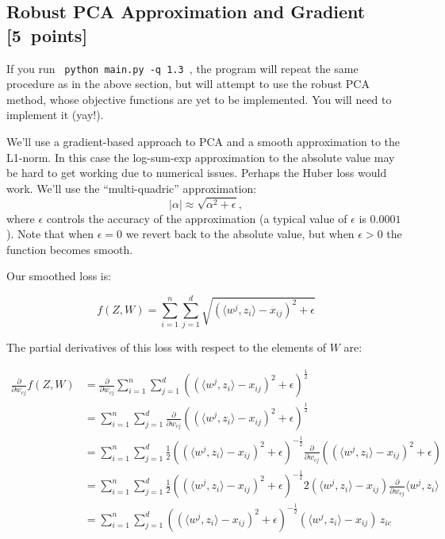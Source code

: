 \documentclass{article}
\newcommand\pts[1]{\textcolor{pointscolour}{[#1~points]}}
\begin{document}
\subsection{Robust PCA Approximation and Gradient \pts{5}}

If you run \verb| python main.py -q 1.3 |, the program will repeat the same procedure as in the above section, but will attempt to use the robust PCA method, whose objective functions are yet to be implemented. You will need to implement it (yay!).

We'll use a gradient-based approach to PCA and a smooth approximation to the L1-norm. In this case the log-sum-exp approximation to the absolute value may be hard to get working due to numerical issues. Perhaps the Huber loss would work. We'll use the ``multi-quadric'' approximation:
\[
|\alpha| \approx \sqrt{\alpha^2 + \epsilon},
\]
where $\epsilon$ controls the accuracy of the approximation (a typical value of $\epsilon$ is $0.0001$). Note that when $\epsilon=0$ we revert back to the absolute value, but when $\epsilon>0$ the function becomes smooth.

Our smoothed loss is:

\[
f(Z,W) = \sum_{i=1}^n\sum_{j=1}^d \sqrt{(\langle w^j, z_i\rangle - x_{ij})^2 + \epsilon }
\]

The partial derivatives of this loss with respect to the elements of $W$ are:

\begin{align*}
\frac{\partial}{\partial w_{cj}} f(Z,W) &= \frac{\partial}{\partial w_{cj}} \sum_{i=1}^n\sum_{j=1}^d \left( (\langle w^j, z_i\rangle - x_{ij})^2 + \epsilon \right)^{\frac12} \\
 &= \sum_{i=1}^n\sum_{j=1}^d  \frac{\partial}{\partial w_{cj}} \left( (\langle w^j, z_i\rangle - x_{ij})^2 + \epsilon \right)^{\frac12} \\
  &= \sum_{i=1}^n\sum_{j=1}^d  \frac12 \left( (\langle w^j, z_i\rangle - x_{ij})^2 + \epsilon \right)^{-\frac12} \frac{\partial}{\partial w_{cj}} \left( (\langle w^j, z_i\rangle - x_{ij})^2 + \epsilon \right) \\
  &= \sum_{i=1}^n\sum_{j=1}^d  \frac12  \left( (\langle w^j, z_i\rangle - x_{ij})^2 + \epsilon \right)^{-\frac12} 2  (\langle w^j, z_i\rangle - x_{ij})  \frac{\partial}{\partial w_{cj}} \langle w^j, z_i\rangle \\
  &= \sum_{i=1}^n\sum_{j=1}^d  \left( (\langle w^j, z_i\rangle - x_{ij})^2 + \epsilon \right)^{-\frac12}  (\langle w^j, z_i\rangle - x_{ij}) \, z_{ic}
\end{align*}
\end{document}
